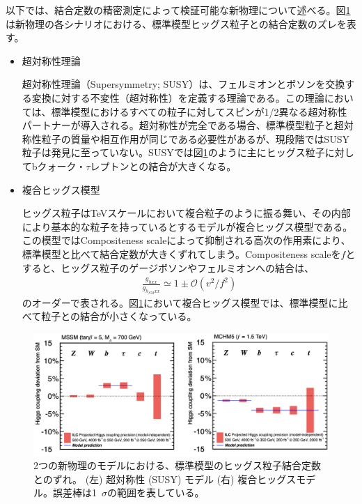 以下では、結合定数の精密測定によって検証可能な新物理について述べる。図\ref{bsmdecay}は新物理の各シナリオにおける、標準模型ヒッグス粒子との結合定数のズレを表す。
\begin{itemize}
\item{超対称性理論}

超対称性理論（Supersymmetry; SUSY）は、フェルミオンとボソンを交換する変換に対する不変性（超対称性）を定義する理論である。この理論においては、標準模型におけるすべての粒子に対してスピンが1/2異なる超対称性パートナーが導入される。超対称性が完全である場合、標準模型粒子と超対称性粒子の質量や相互作用が同じである必要性があるが、現段階ではSUSY粒子は発見に至っていない。SUSYでは図\ref{bsmdecay}のように主にヒッグス粒子に対してbクォーク・$\tau$レプトンとの結合が大きくなる。
\item{複合ヒッグス模型}

ヒッグス粒子はTeVスケールにおいて複合粒子のように振る舞い、その内部により基本的な粒子を持っているとするモデルが複合ヒッグス模型である。この模型ではCompositeness scaleによって抑制される高次の作用素により、標準模型と比べて結合定数が大きくずれてしまう。Compositeness scaleを$f$とすると、ヒッグス粒子のゲージボソンやフェルミオンへの結合は、
\begin{align}
\frac{g_{hxx}}{g_{h_{SM}xx}} \simeq 1 \pm \mathcal{O}(v^2 / f^2)
\end{align}
のオーダーで表される。図\ref{bsmdecay}において複合ヒッグス模型では、標準模型に比べて粒子との結合が小さくなっている。
\end{itemize}
\begin{figure}[H]
	\begin{center}
 \includegraphics[keepaspectratio, scale=0.25]
 	{Figure/Introduction/bsmdecay.png}
 		\caption{2つの新物理のモデルにおける、標準模型のヒッグス粒子結合定数とのずれ。 (左) 超対称性 (SUSY) モデル (右) 複合ヒッグスモデル。誤差棒は1\, $\sigma$の範囲を表している。}
 		\label{bsmdecay}
	\end{center}
\end{figure}
